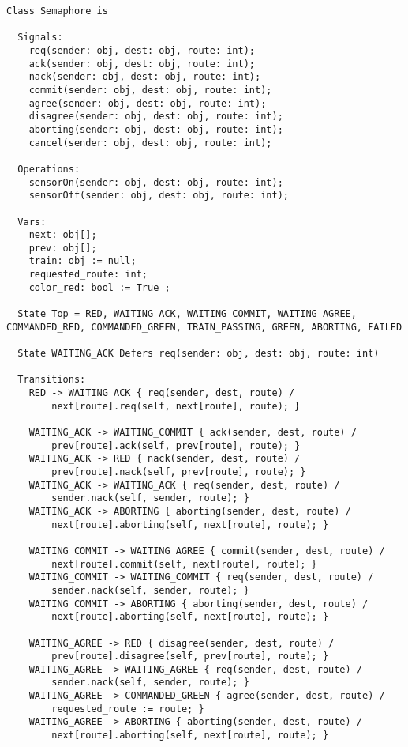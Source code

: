 \begin{lstlisting}[caption={modello della classe Semaphore}]
Class Semaphore is

  Signals:
    req(sender: obj, dest: obj, route: int);        
    ack(sender: obj, dest: obj, route: int);
    nack(sender: obj, dest: obj, route: int);
    commit(sender: obj, dest: obj, route: int);
    agree(sender: obj, dest: obj, route: int);
    disagree(sender: obj, dest: obj, route: int);
    aborting(sender: obj, dest: obj, route: int);
    cancel(sender: obj, dest: obj, route: int);

  Operations:
    sensorOn(sender: obj, dest: obj, route: int);  
    sensorOff(sender: obj, dest: obj, route: int);

  Vars:
    next: obj[];             
    prev: obj[];             
    train: obj := null;      
    requested_route: int;
    color_red: bool := True ;          

  State Top = RED, WAITING_ACK, WAITING_COMMIT, WAITING_AGREE, COMMANDED_RED, COMMANDED_GREEN, TRAIN_PASSING, GREEN, ABORTING, FAILED
  
  State WAITING_ACK Defers req(sender: obj, dest: obj, route: int)

  Transitions:
    RED -> WAITING_ACK { req(sender, dest, route) / 
    	next[route].req(self, next[route], route); }

    WAITING_ACK -> WAITING_COMMIT { ack(sender, dest, route) / 
    	prev[route].ack(self, prev[route], route); }
    WAITING_ACK -> RED { nack(sender, dest, route) / 
   		prev[route].nack(self, prev[route], route); }
    WAITING_ACK -> WAITING_ACK { req(sender, dest, route) / 
    	sender.nack(self, sender, route); }
    WAITING_ACK -> ABORTING { aborting(sender, dest, route) / 
    	next[route].aborting(self, next[route], route); }

    WAITING_COMMIT -> WAITING_AGREE { commit(sender, dest, route) / 
    	next[route].commit(self, next[route], route); }
    WAITING_COMMIT -> WAITING_COMMIT { req(sender, dest, route) / 
    	sender.nack(self, sender, route); }
    WAITING_COMMIT -> ABORTING { aborting(sender, dest, route) / 
    	next[route].aborting(self, next[route], route); }

    WAITING_AGREE -> RED { disagree(sender, dest, route) / 
    	prev[route].disagree(self, prev[route], route); }
    WAITING_AGREE -> WAITING_AGREE { req(sender, dest, route) / 
    	sender.nack(self, sender, route); }
    WAITING_AGREE -> COMMANDED_GREEN { agree(sender, dest, route) / 
    	requested_route := route; }
    WAITING_AGREE -> ABORTING { aborting(sender, dest, route) / 
    	next[route].aborting(self, next[route], route); }


\end{lstlisting}
